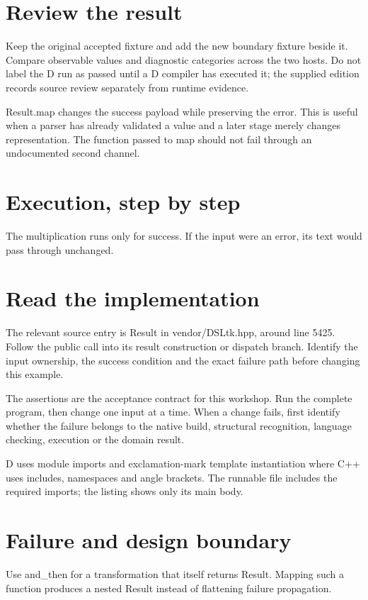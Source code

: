 \section*{Review the result}
Keep the original accepted fixture and add the new boundary fixture beside it. Compare observable values and diagnostic categories across the two hosts. Do not label the D run as passed until a D compiler has executed it; the supplied edition records source review separately from runtime evidence.

\clearpage
{}
Result.map changes the success payload while preserving the error. This is useful when a parser has already validated a value and a later stage merely changes representation. The function passed to map should not fail through an undocumented second channel.


\section*{Execution, step by step}
The multiplication runs only for success. If the input were an error, its text would pass through unchanged.

\section*{Read the implementation}
The relevant source entry is Result in vendor/DSLtk.hpp, around line 5425. Follow the public call into its result construction or dispatch branch. Identify the input ownership, the success condition and the exact failure path before changing this example.

The assertions are the acceptance contract for this workshop. Run the complete program, then change one input at a time. When a change fails, first identify whether the failure belongs to the native build, structural recognition, language checking, execution or the domain result.

\clearpage
{}
D uses module imports and exclamation-mark template instantiation where C++ uses includes, namespaces and angle brackets. The runnable file includes the required imports; the listing shows only its main body.


\section*{Failure and design boundary}
Use and\_then for a transformation that itself returns Result. Mapping such a function produces a nested Result instead of flattening failure propagation.

